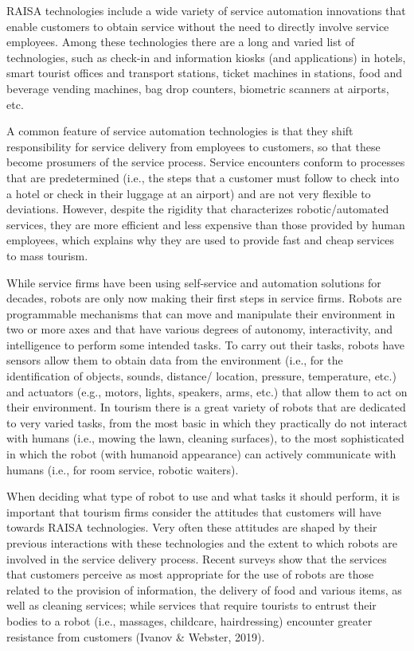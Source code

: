 \documentclass[
  letterpaper,
  DIV=11,
  numbers=noendperiod]{scrreprt}
\begin{document}
RAISA technologies include a wide variety of service automation
innovations that enable customers to obtain service without the need to
directly involve service employees. Among these technologies there are a
long and varied list of technologies, such as check-in and information
kiosks (and applications) in hotels, smart tourist offices and transport
stations, ticket machines in stations, food and beverage vending
machines, bag drop counters, biometric scanners at airports, etc.

A common feature of service automation technologies is that they shift
responsibility for service delivery from employees to customers, so that
these become prosumers of the service process. Service encounters
conform to processes that are predetermined (i.e., the steps that a
customer must follow to check into a hotel or check in their luggage at
an airport) and are not very flexible to deviations. However, despite
the rigidity that characterizes robotic/automated services, they are
more efficient and less expensive than those provided by human
employees, which explains why they are used to provide fast and cheap
services to mass tourism.

While service firms have been using self-service and automation
solutions for decades, robots are only now making their first steps in
service firms. Robots are programmable mechanisms that can move and
manipulate their environment in two or more axes and that have various
degrees of autonomy, interactivity, and intelligence to perform some
intended tasks. To carry out their tasks, robots have sensors allow them
to obtain data from the environment (i.e., for the identification of
objects, sounds, distance/ location, pressure, temperature, etc.) and
actuators (e.g., motors, lights, speakers, arms, etc.) that allow them
to act on their environment. In tourism there is a great variety of
robots that are dedicated to very varied tasks, from the most basic in
which they practically do not interact with humans (i.e., mowing the
lawn, cleaning surfaces), to the most sophisticated in which the robot
(with humanoid appearance) can actively communicate with humans (i.e.,
for room service, robotic waiters).

When deciding what type of robot to use and what tasks it should
perform, it is important that tourism firms consider the attitudes that
customers will have towards RAISA technologies. Very often these
attitudes are shaped by their previous interactions with these
technologies and the extent to which robots are involved in the service
delivery process. Recent surveys show that the services that customers
perceive as most appropriate for the use of robots are those related to
the provision of information, the delivery of food and various items, as
well as cleaning services; while services that require tourists to
entrust their bodies to a robot (i.e., massages, childcare,
hairdressing) encounter greater resistance from customers (Ivanov \&
Webster, 2019).
\end{document}
